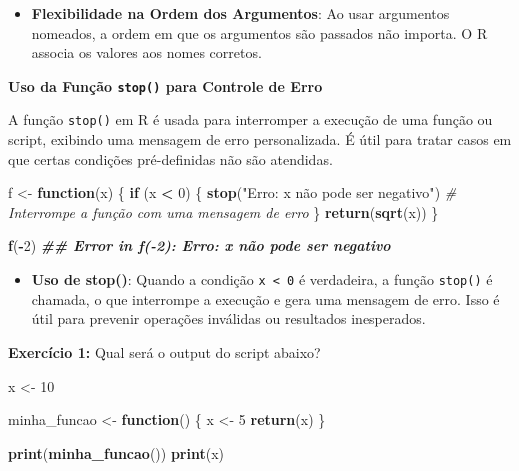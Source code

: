 \documentclass[
]{book}
\newenvironment{Shaded}{\begin{snugshade}}{\end{snugshade}}
\newcommand{\CommentTok}[1]{\textcolor[rgb]{0.56,0.35,0.01}{\textit{#1}}}
\newcommand{\ControlFlowTok}[1]{\textcolor[rgb]{0.13,0.29,0.53}{\textbf{#1}}}
\newcommand{\DecValTok}[1]{\textcolor[rgb]{0.00,0.00,0.81}{#1}}
\newcommand{\DocumentationTok}[1]{\textcolor[rgb]{0.56,0.35,0.01}{\textbf{\textit{#1}}}}
\newcommand{\FunctionTok}[1]{\textcolor[rgb]{0.13,0.29,0.53}{\textbf{#1}}}
\newcommand{\NormalTok}[1]{#1}
\newcommand{\OtherTok}[1]{\textcolor[rgb]{0.56,0.35,0.01}{#1}}
\newcommand{\SpecialCharTok}[1]{\textcolor[rgb]{0.81,0.36,0.00}{\textbf{#1}}}
\newcommand{\StringTok}[1]{\textcolor[rgb]{0.31,0.60,0.02}{#1}}
\providecommand{\tightlist}{%
  \setlength{\itemsep}{0pt}\setlength{\parskip}{0pt}}
\begin{document}
\begin{itemize}
\tightlist
\item
  \textbf{Flexibilidade na Ordem dos Argumentos}: Ao usar argumentos
  nomeados, a ordem em que os argumentos são passados não importa. O R
  associa os valores aos nomes corretos.
\end{itemize}

\textbf{Uso da Função \texttt{stop()} para Controle de Erro}

A função \texttt{stop()} em R é usada para interromper a execução de uma função
ou script, exibindo uma mensagem de erro personalizada. É útil para
tratar casos em que certas condições pré-definidas não são atendidas.

\begin{Shaded}
\begin{Highlighting}[]
\NormalTok{f }\OtherTok{\textless{}{-}} \ControlFlowTok{function}\NormalTok{(x) \{}
  \ControlFlowTok{if}\NormalTok{ (x }\SpecialCharTok{\textless{}} \DecValTok{0}\NormalTok{) \{}
    \FunctionTok{stop}\NormalTok{(}\StringTok{"Erro: x não pode ser negativo"}\NormalTok{)  }\CommentTok{\# Interrompe a função com uma mensagem de erro}
\NormalTok{  \}}
  \FunctionTok{return}\NormalTok{(}\FunctionTok{sqrt}\NormalTok{(x))}
\NormalTok{\}}

\FunctionTok{f}\NormalTok{(}\SpecialCharTok{{-}}\DecValTok{2}\NormalTok{)}
\DocumentationTok{\#\# Error in f({-}2): Erro: x não pode ser negativo}
\end{Highlighting}
\end{Shaded}

\begin{itemize}
\tightlist
\item
  \textbf{Uso de stop()}: Quando a condição \texttt{x\ \textless{}\ 0} é verdadeira, a função
  \texttt{stop()} é chamada, o que interrompe a execução e gera uma mensagem
  de erro. Isso é útil para prevenir operações inválidas ou resultados
  inesperados.
\end{itemize}

\textbf{Exercício 1:} Qual será o output do script abaixo?

\begin{Shaded}
\begin{Highlighting}[]
\NormalTok{x }\OtherTok{\textless{}{-}} \DecValTok{10}  

\NormalTok{minha\_funcao }\OtherTok{\textless{}{-}} \ControlFlowTok{function}\NormalTok{() \{}
\NormalTok{    x }\OtherTok{\textless{}{-}} \DecValTok{5}  
    \FunctionTok{return}\NormalTok{(x)}
\NormalTok{\}}

\FunctionTok{print}\NormalTok{(}\FunctionTok{minha\_funcao}\NormalTok{()) }
\FunctionTok{print}\NormalTok{(x) }
\end{Highlighting}
\end{Shaded}
\end{document}
